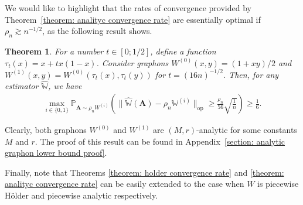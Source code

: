 \documentclass[11pt]{article}
\newcommand{\bA}{\bm{A}}
\newcommand{\opnorm}[1]{\|#1\|_{\mathrm{op}}}
\newcommand{\bbW}{\mathbb{W}}
\newcommand{\bbP}{\mathbb{P}}
\newcommand{\<}{\langle}
\renewcommand{\>}{\rangle}
\theoremstyle{plain}
\newtheorem{theorem}{Theorem}
\theoremstyle{definition}
\theoremstyle{remark}
\begin{document}
{
We would like to highlight that the rates of convergence provided by Theorem~\ref{theorem: analityc convergence rate} are essentially optimal if $\rho_n \gtrsim n^{-1/2}$, as the following result shows.
\begin{theorem}
\label{theorem: analytic graphon estimation lower bound}
For a number $t \in [0; 1/2]$, define a function $\tau_t(x) = x + t x(1 - x)$. Consider graphons $W^{(0)}(x, y)  = (1 + xy)/2$
and $W^{(1)}(x, y) = W^{(0)}(\tau_t(x), \tau_t(y))$ for $t = (16 n)^{-1/2}$. Then, for any estimator $\widehat{\bbW}$, we have
\begin{align*}
    \max_{i \in \{0, 1\}} \bbP_{\bA \sim \rho_n W^{(i)}} \left ( \opnorm{\widehat{\bbW}(\bA) - \rho_n \bbW^{(i)}} \ge \frac{\rho_n}{56} \sqrt{\frac{1}{n}} \right ) \ge \frac{1}{6}.
\end{align*}
\end{theorem}

Clearly, both graphons $W^{(0)}$ and $W^{(1)}$ are $(M, r)$-analytic for some constants $M$ and $r$. The proof of this result can be found in Appendix~\ref{section: analytic graphon lower bound proof}.
}



Finally, note that
    Theorems \ref{theorem: holder convergence rate} and \ref{theorem: analityc convergence rate} can be easily extended to the case when $W$ is piecewise H\"older and piecewise analytic respectively.
\end{document}
